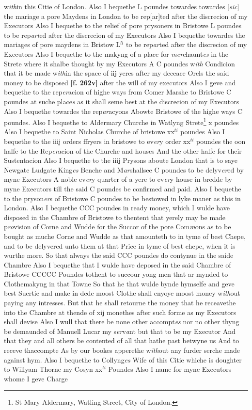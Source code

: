 \documentclass[a4paper,12pt]{article}
\begin{document}
w\textit{ith}in this Citie of London. Also I bequethe L poundes towardes towardes [\textit{sic}] the mariage a pore Maydens in London to be rep[ar]ted after the discrecion of my Executors Also I bequethe to the relief of pore prysoners in Bristowe L poundes to be rep\textit{art}ed after the discrecion of my Executors Also I bequethe towardes the mariages of pore maydens in Bristow L$^{li}$ to be rep\textit{ar}ted after the discrecion of my Executors Also I bequethe to the makyng of a place for \textit{mer}chaunt\textit{es} in the Strete where it shalbe thought by my Executors A C poundes w\textit{ith} Condicion that it be made w\textit{ith}in the space of iij yeres after my deceace Orels the said money to be disposed \textbf{[f. 262v]} after the will of my executors Also I geve and bequethe to the rep\textit{er}acion of highe ways from Comer Marshe to Bristowe C poundes at suche place\textit{s} as it shall seme best at the discrecion of my Executors Also I bequethe towardes the rep\textit{ar}acyons Abowte Bristowe of the highe ways C poundes. Also I bequethe to Aldermary Churche in Watlyng Strete\footnote{St Mary Aldermary, Watling Street, City of London.} x poundes Also I bequethe to Saint Nicholas Churche of bristowe xx$^{ti}$ poundes Also I bequethe to the iiij orders ffryers in bristowe to ev\textit{er}y order xx$^{ti}$ poundes the oon halfe to the Rep\textit{er}acion of the Churche and houses And the other halfe for their Sustentacion Also I bequethe to the iiij Prysons aboute London that is to saye Newgate Ludgate King\textit{es} Benche and M\textit{ar}shallsee C poundes to be delyv\textit{er}ed by myne Executors A noble ev\textit{er}y quarter of a yere to ev\textit{er}y house in bredde by myne Executors till the said C poundes be confirmed and paid. Also I bequethe to the pryson\textit{er}s of Bristowe C poundes to be bestowed in lyke maner as this in London. Also I bequethe CCC poundes in ready money, which I wulde have disposed in the Chambre of Bristowe to thentent that yerely may be made p\textit{ro}vision of Corne and Wudde for the Succor of the pore Com\textit{m}ons as to be bought as muche Corne and Wudde as that amounteth to in tyme of best Chepe, and to be delyvered unto them at that Price in tyme of best chepe, when it is wurthe more. So that always the said CCC poundes do contynue in the saide Chambre Also I bequethe that I wulde have deposed in the said Chambre of Bristowe CCCCC Poundes tothent to succour yong men that ar mynded to Clothemakyng in that Towne So that he that wulde bynde hymselfe and geve best Suertie and make in dede moost Clothe shall enyoye moost money w\textit{ith}out paying any intresses. But that he shall retourne the money that he receavethe into the Chambre at thende of xij monethes after such forme as my Executors shall devise Also I wull that there be none other accompt\textit{es} nor no other thyng be demaunded of Manuell Lucar my s\textit{er}v\textit{a}nt but that to be my Executor And that they and all others be contented of all that hathe past betwyne us And to receve thaccompte As by our bookes apperethe w\textit{ith}out any furder serche made against hym. Also I bequethe to Collyng\textit{es} Wife of this Citie whiche is doughter to Willyam Thorne my Cosyn xx$^{ti}$ Poundes Also I name for myne Executors whome I geve Charge 
\end{document}
